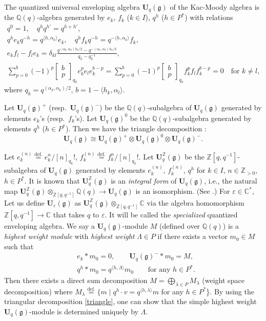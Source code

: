 \documentclass[12pt]{amsart}
\def\Bbb{\mathbb}
\theoremstyle{definition}
\theoremstyle{remark}
\numberwithin{equation}{subsection}
\newcommand{\defeq}{\overset{\operatorname{\scriptstyle def.}}{=}}
\newcommand{\C}{{\Bbb C}}
\newcommand{\Z}{{\Bbb Z}}
\newcommand{\Q}{{\Bbb Q}}
\newcommand{\Uq}{{\mathbf U}_q(\mathfrak g)} %
\newcommand{\Ui}{{\mathbf U}^{\Z}_q(\mathfrak g)}
\newcommand{\Ue}{{\mathbf U}_{\varepsilon}(\mathfrak g)}
\begin{document}
The quantized universal enveloping algebra $\Uq$ of the Kac-Moody
algebra is the $\Q(q)$-algebra
generated by $e_k$, $f_k$ ($k \in I$), $q^h$ ($h\in P^*$)
with relations
{\allowdisplaybreaks
\begin{gather}
  q^0 = 1, \quad q^h q^{h'} = q^{h+h'},\\
  q^h e_k q^{-h} = q^{\langle h, \alpha_k\rangle} e_k,\quad
  q^h f_k q^{-h} = q^{-\langle h, \alpha_k\rangle} f_k,\\
  e_k f_l - f_l e_k = \delta_{kl}
   \frac{q^{(\alpha_k,\alpha_k)h_k/2}-q^{-(\alpha_k,\alpha_k)h_k/2}}
         {q_k - q_k^{-1}},\\
  \sum_{p=0}^{b}(-1)^p \begin{bmatrix} b \\ p\end{bmatrix}_{q_k}
                     e_k^p e_l e_k^{b-p} =
  \sum_{p=0}^{b}(-1)^p \begin{bmatrix} b \\ p\end{bmatrix}_{q_k}
                     f_k^p f_l f_k^{b-p} = 0 \quad
  \text{for $k\ne l$,}
\end{gather}
where $q_k = q^{(\alpha_k,\alpha_k)/2}$,
$b = 1 - \langle h_k,\alpha_l\rangle$.}

Let $\Uq^+$ (resp.\ $\Uq^-$) be the $\Q(q)$-subalgebra of $\Uq$
generated by elements $e_k$'s (resp.\ $f_k$'s).  Let $\Uq^0$
be the $\Q(q)$-subalgebra generated by elements $q^h$ ($h\in P^*$).
Then we have the triangle decomposition \cite[3.2.5]{Lu-Book}:
\begin{equation}
  \Uq \cong \Uq^+ \otimes \Uq^0 \otimes \Uq^- .
  \label{triangle}
\end{equation}

Let $e_k^{(n)}\defeq e_k^n/[n]_{q_k}!$, 
$f_k^{(n)}\defeq f_k^n/[n]_{q_k}!$.
Let $\Ui$ be the $\Z[q,q^{-1}]$-subalgebra of $\Uq$ generated by
elements
$e_k^{(n)}$, $f_k^{(n)}$, $q^h$ for $k\in I$, $n\in\Z_{> 0}$,
$h\in P^*$.
It is known that $\Ui$ is an {\it integral form\/} of $\Uq$, i.e.,
the natural map $\Ui\otimes_{\Z[q,q^{-1}]}\Q(q) \to \Uq$ is an
isomorphism. (See \cite[9.3.1]{CP}.)
For $\varepsilon\in\C^*$, Let us define $\Ue$ as
$\Ui\otimes_{\Z[q,q^{-1}]}\C$ via the
algebra homomorphism $\Z[q,q^{-1}]\to \C$ that takes $q$ to
$\varepsilon$. It will be called the {\it specialized\/} quantized
enveloping algebra.
%
We say a $\Uq$-module $M$ (defined over $\Q(q)$)
is a {\it highest weight module\/} with
{\it highest weight\/} $\Lambda\in P$ if
there exists a vector $m_0\in M$ such that
\begin{align}
  & e_k\ast m_0 = 0, \qquad \Uq^- \ast m_0 = M, \\
  & q^h\ast m_0 = q^{\langle h, \Lambda\rangle} m_0
\qquad\text{for any $h\in P^*$.}
\end{align}
Then there exists a direct sum decomposition $M =
\bigoplus_{\lambda\in P} M_\lambda$ (weight space decomposition)
where
$M_\lambda \defeq \{ m\mid 
q^h\cdot v = q^{\langle h, \lambda\rangle} m$ for any $h\in P^*$\}.
%
By using the triangular decomposition \eqref{triangle}, one can show
that the simple highest weight $\Uq$-module is determined
uniquely by $\Lambda$.
\end{document}
